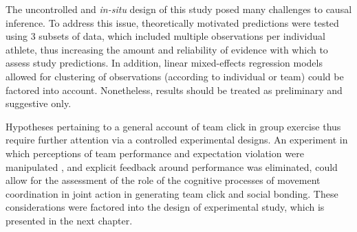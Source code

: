 \begin{CJK}{UTF8}{gbsn}
The uncontrolled and \textit{in-situ} design of this study posed many challenges to causal inference.  To address this issue, theoretically motivated predictions were tested using 3 subsets of data, which included multiple observations per individual athlete, thus increasing the amount and reliability of evidence with which to assess study predictions. In addition, linear mixed-effects regression models allowed for clustering of observations (according to individual or team) could be factored into account. Nonetheless, results should be treated as preliminary and suggestive only.

Hypotheses pertaining to a general account of team click in group exercise thus require further attention via a controlled experimental designs.  An experiment in which perceptions of team performance and expectation violation were manipulated , and explicit feedback around performance was eliminated, could allow for the assessment of the role of the cognitive processes of movement coordination in joint action in generating team click and social bonding.  These considerations were factored into the design of experimental study, which is presented in the next chapter.
                                                \end{CJK}
